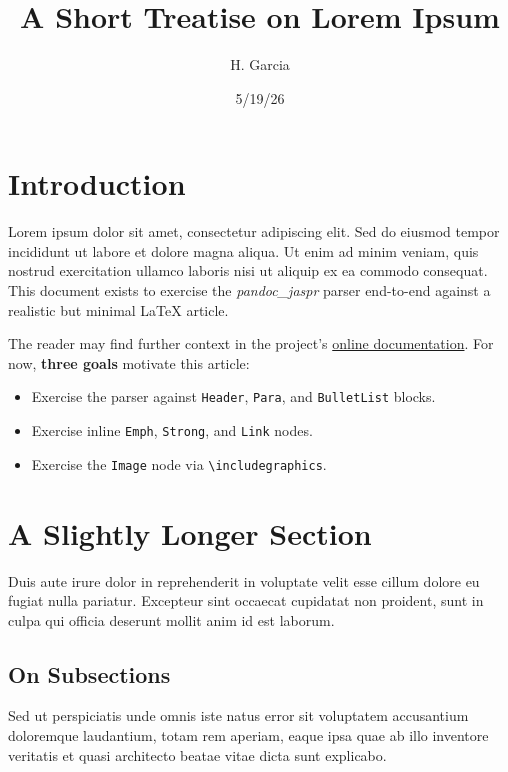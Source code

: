 \documentclass[a4paper,10pt]{article}
\title{A Short Treatise on Lorem Ipsum}
\author{H. Garcia}
\date{5/19/26}
\begin{document}
\maketitle
\tableofcontents

\section{Introduction}
\label{sec:introduction}

Lorem ipsum dolor sit amet, consectetur adipiscing elit. Sed do eiusmod
tempor incididunt ut labore et dolore magna aliqua. Ut enim ad minim
veniam, quis nostrud exercitation ullamco laboris nisi ut aliquip ex ea
commodo consequat. This document exists to exercise the \emph{pandoc\_jaspr}
parser end-to-end against a realistic but minimal LaTeX article.

The reader may find further context in the project's \href{https://example.org/pandoc-jaspr}{online documentation}.
For now, \textbf{three goals} motivate this article:

\begin{itemize}
  \item Exercise the parser against \texttt{Header}, \texttt{Para}, and \texttt{BulletList} blocks.
  \item Exercise inline \texttt{Emph}, \texttt{Strong}, and \texttt{Link} nodes.
  \item Exercise the \texttt{Image} node via \verb|\includegraphics|.
\end{itemize}

\section{A Slightly Longer Section}
\label{sec:longer}

Duis aute irure dolor in reprehenderit in voluptate velit esse cillum
dolore eu fugiat nulla pariatur. Excepteur sint occaecat cupidatat non
proident, sunt in culpa qui officia deserunt mollit anim id est laborum.

\subsection{On Subsections}
\label{subsec:on-subsections}

Sed ut perspiciatis unde omnis iste natus error sit voluptatem accusantium
doloremque laudantium, totam rem aperiam, eaque ipsa quae ab illo inventore
veritatis et quasi architecto beatae vitae dicta sunt explicabo.
\end{document}
